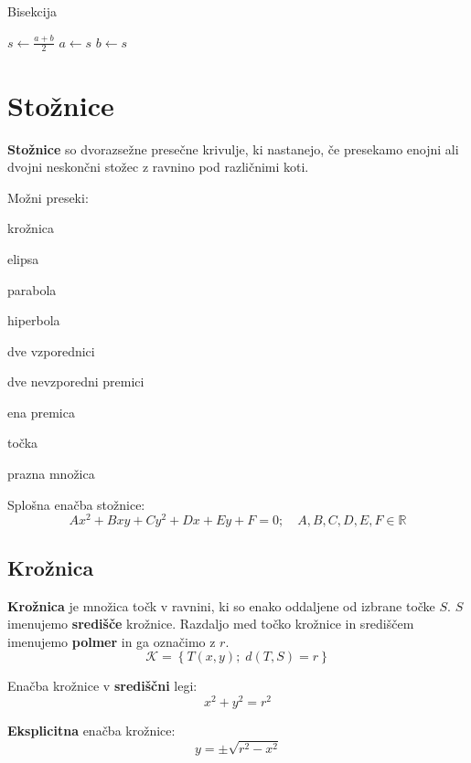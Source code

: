 \documentclass[a4paper,oneside,12pt,fleqn]{article}
\def\R{\ensuremath{\mathbb R}}
\numberwithin{equation}{section}
\newenvironment{itemize*}%
{
\vspace{-12pt}%
\begin{itemize}%
\setlength{\itemsep}{0pt}%
\setlength{\parskip}{2pt}}%
{\end{itemize}}
\begin{document}
\begin{algorithm}[h!]
  \caption{Bisekcija}\label{algo:bisekcija}
  \begin{algorithmic}[1]
        \State $s \gets \frac{a+b}{2}$
          \State $a \gets s$
        \Else
          \State $b \gets s$
        \EndIf
    \EndWhile
  \end{algorithmic}
\end{algorithm}

\section{Stožnice}
\label{sec:stoz}
\textbf{Stožnice} so dvorazsežne presečne krivulje, ki nastanejo, če presekamo enojni ali dvojni
neskončni stožec z ravnino pod različnimi koti.

Možni preseki:
\begin{itemize*}
  \item krožnica
  \item elipsa
  \item parabola
  \item hiperbola
  \item dve vzporednici
  \item dve nevzporedni premici
  \item ena premica
  \item točka
  \item prazna množica
\end{itemize*}

Splošna enačba stožnice:
\begin{equation}
  Ax^2 + Bxy + Cy^2 + Dx + Ey + F = 0; \quad A, B, C, D, E, F \in \R
  \label{eq:stoz:def}
\end{equation}

\subsection{Krožnica}
\label{sec:stoz:kroz}
\textbf{Krožnica} je množica točk v ravnini, ki so enako oddaljene od izbrane točke $S$. $S$
imenujemo \textbf{središče} krožnice. Razdaljo med točko krožnice in središčem imenujemo
\textbf{polmer} in
ga označimo z $r$.
\[ \mathcal{K} = \left\{ T(x, y); \; d(T, S) = r \right\} \]

Enačba krožnice v \textbf{središčni} legi:
\[ x^2 + y^2 = r^2 \]

\textbf{Eksplicitna} enačba krožnice:
\begin{equation}
    y = \pm \sqrt{r^2 - x^2}
  \label{eq:kroz:eksp}
\end{equation}
\end{document}
